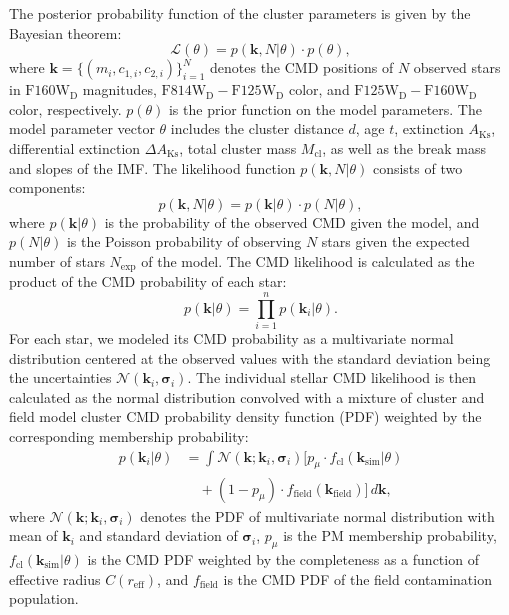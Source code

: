 \documentclass[12pt]{ucsddissertation}
\newcommand{\AKs}{A_{\mathrm{Ks}}}
\newcommand{\reff}{r_\mathrm{eff}}
\begin{document}
\begin{CJK*}{UTF8}{gbsn}
The posterior probability function of the cluster parameters is given by the Bayesian theorem:
\begin{equation}
    \mathcal{L}\left(\theta\right) = p\left(\mathbf{k}, N|\theta\right) \cdot p\left(\theta\right),
    \label{eq:cmd_likelihood}
\end{equation}
where $\mathbf{k} = \lbrace\left(m_i, c_{1,i}, c_{2,i}\right)\rbrace_{i=1}^N$ denotes the CMD positions of $N$ observed stars in $\mathrm{F160W_D}$ magnitudes, $\mathrm{F814W_D} - \mathrm{F125W_D}$ color, and $\mathrm{F125W_D} - \mathrm{F160W_D}$ color, respectively. $p\left(\theta\right)$ is the prior function on the model parameters. The model parameter vector $\theta$ includes the cluster distance $d$, age $t$, extinction $\AKs$, differential extinction $\Delta\AKs$, total cluster mass $M_\mathrm{cl}$, as well as the break mass and slopes of the IMF. The likelihood function $p\left(\mathbf{k}, N|\theta\right)$ consists of two components:
\begin{equation}
    p\left(\mathbf{k}, N|\theta\right) = p\left(\mathbf{k}|\theta\right) \cdot p\left(N|\theta\right),
\end{equation}
where $p\left(\mathbf{k}|\theta\right)$ is the probability of the observed CMD given the model, and $p\left(N|\theta\right)$ is the Poisson probability of observing $N$ stars given the expected number of stars $N_\mathrm{exp}$ of the model. The CMD likelihood is calculated as the product of the CMD probability of each star:
\begin{equation}
    p\left(\mathbf{k} | \theta\right) = \prod_{i=1}^n p\left(\mathbf{k}_i | \theta\right).
\end{equation}
For each star, we modeled its CMD probability as a multivariate normal distribution centered at the observed values with the standard deviation being the uncertainties $\mathcal{N}\left(\mathbf{k}_i, \mathbf{\sigma}_i\right)$. The individual stellar CMD likelihood is then calculated as the normal distribution convolved with a mixture of cluster and field model cluster CMD probability density function (PDF) weighted by the corresponding membership probability:
\begin{align}
    p\left(\mathbf{k}_i | \theta\right) 
    &= \int \mathcal{N} \left(\mathbf{k} ; \mathbf{k}_i, \mathbf{\sigma}_i\right) \bigg[
        p_\mu \cdot f_\mathrm{cl}\left( \mathbf{k}_\mathrm{sim} | \theta\right) \nonumber \\
    &\quad + \left(1 - p_\mu\right) \cdot f_\mathrm{field}\left( \mathbf{k}_\mathrm{field} \right)
    \bigg] \, d\mathbf{k},
\end{align}
where $\mathcal{N} \left(\mathbf{k}; \mathbf{k}_i, \mathbf{\sigma}_i\right)$ denotes the PDF of multivariate normal distribution with mean of $\mathbf{k}_i$ and standard deviation of $\mathbf{\sigma}_i$, $p_\mu$ is the PM membership probability, $f_\mathrm{cl}\left( \mathbf{k}_\mathrm{sim}| \theta \right)$ is the CMD PDF weighted by the completeness as a function of effective radius $C\left(\reff\right)$, and $f_\mathrm{field}$ is the CMD PDF of the field contamination population.


\end{CJK*}
\end{document}
